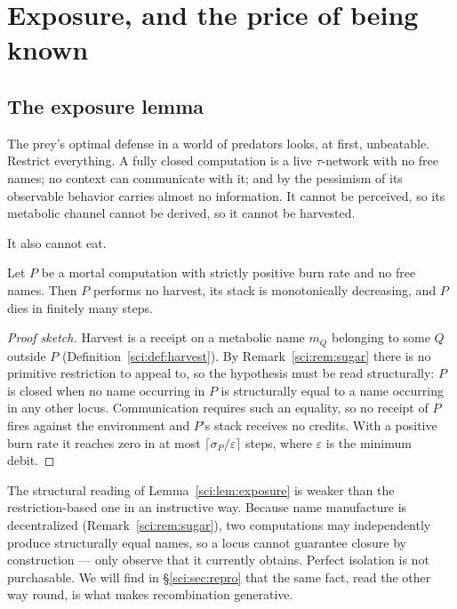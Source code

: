 \section{Exposure, and the price of being known}\label{sci:S9}
\label{sci:sec:exposure}

\subsection{The exposure lemma}\label{sci:S9.1}

The prey's optimal defense in a world of predators looks, at first, unbeatable. Restrict everything.
A fully closed computation is a live $\tau$-network with no free names; no context can communicate
with it; and by the pessimism of \cite[\S1]{ClassifierNote} its observable behavior carries almost no
information. It cannot be perceived, so its metabolic channel cannot be derived, so it cannot be
harvested.

It also cannot eat.

\begin{lemma}[Exposure]
\label{sci:lem:exposure}
Let $P$ be a mortal computation with strictly positive burn rate and no free names. Then $P$ performs
no harvest, its stack is monotonically decreasing, and $P$ dies in finitely many steps.
\end{lemma}

\begin{proof}[Proof sketch]
Harvest is a receipt on a metabolic name $m_Q$ belonging to some $Q$ outside $P$
(Definition~\ref{sci:def:harvest}). By Remark~\ref{sci:rem:sugar} there is no primitive restriction to appeal
to, so the hypothesis must be read structurally: $P$ is closed when no name occurring in $P$ is
structurally equal to a name occurring in any other locus. Communication requires such an equality, so
no receipt of $P$ fires against the environment and $P$'s stack receives no credits. With a positive
burn rate it reaches zero in at most $\lceil \sigma_P / \varepsilon \rceil$ steps, where $\varepsilon$
is the minimum debit.
\end{proof}

\begin{remark}
\label{sci:rem:luck}
The structural reading of Lemma~\ref{sci:lem:exposure} is weaker than the restriction-based one in an
instructive way. Because name manufacture is decentralized (Remark~\ref{sci:rem:sugar}), two computations
may independently produce structurally equal names, so a locus cannot guarantee closure by
construction --- only observe that it currently obtains. Perfect isolation is not purchasable. We will
find in \S\ref{sci:sec:repro} that the same fact, read the other way round, is what makes recombination
generative.
\end{remark}

